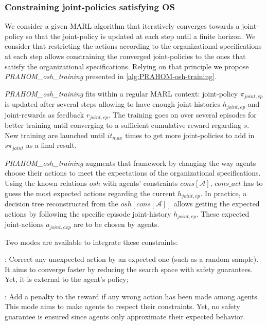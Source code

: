 \documentclass[runningheads]{llncs}
\newcounter{relation}
\newcounter{proof}
\begin{document}


\subsubsection{\textbf{Constraining joint-policies satisfying OS}}



We consider a given MARL algorithm that iteratively converges towards a joint-policy so that the joint-policy is updated at each step until a finite horizon.
We consider that restricting the actions according to the organizational specifications at each step allows constraining the converged joint-policies to the ones that satisfy the organizational specifications\footnotemark[1]. Relying on that principle we propose \emph{PRAHOM\_osh\_training} presented in \autoref{alg:PRAHOM-osh-training}.

\emph{PRAHOM\_osh\_training} fits within a regular MARL context: joint-policy $\pi_{joint,ep}$ is updated after several steps allowing to have enough joint-histories $h_{joint,ep}$ and joint-rewards as feedback $r_{joint,ep}$. The training goes on over several episodes for better training until converging to a sufficient cumulative reward regarding $s$. New training are launched until $it_{max}$ times to get more joint-policies to add in $s\pi_{joint}$ as a final result.

\emph{PRAHOM\_osh\_training} augments that framework by changing the way agents choose their actions to meet the expectations of the organizational specifications. Using the known relations $osh$ with agents' constraints $cons[\mathcal{A}]$, $cons\_act$ has to guess the most expected actions regarding the current $h_{joint,ep}$. In practice, a decision tree reconstructed from the $osh[cons[\mathcal{A}]]$ allows getting the expected actions by following the specific episode joint-history $h_{joint,ep}$. These expected joint-actions $a_{joint,exp}$ are to be chosen by agents.

Two modes are available to integrate these constraints:
%
\begin{enumerate*}[label=\roman*),itemjoin={;\quad}]
    \item {}: Correct any unexpected action by an expected one (such as a random sample). It aims to converge faster by reducing the search space with safety guarantees. Yet, it is external to the agent's policy;
    \item {}: Add a penalty to the reward if any wrong action has been made among agents. This mode aims to make agents  to respect their constraints. Yet, no safety guarantee is ensured since agents only approximate their expected behavior.
\end{enumerate*}
\end{document}
